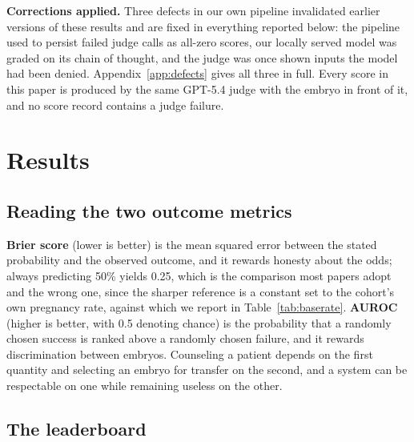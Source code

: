 \documentclass[11pt]{article}
\begin{document}
\textbf{Corrections applied.} Three defects in our own pipeline invalidated
earlier versions of these results and are fixed in everything reported below: the
pipeline used to persist failed judge calls as all-zero scores, our locally
served model was graded on its chain of thought, and the judge was once shown
inputs the model had been denied. Appendix~\ref{app:defects} gives all three in
full. Every score in this paper is produced by the same GPT-5.4 judge with the
embryo in front of it, and no score record contains a judge failure.


\section{Results}
\label{sec:results}


\subsection{Reading the two outcome metrics}

\textbf{Brier score} (lower is better) is the mean squared error between the
stated probability and the observed outcome, and it rewards honesty about the
odds; always predicting 50\% yields 0.25, which is the comparison most papers
adopt and the wrong one, since the sharper reference is a constant set to the
cohort's own pregnancy rate, against which we report in
Table~\ref{tab:baserate}. \textbf{AUROC} (higher is better, with 0.5 denoting
chance) is the probability that a randomly chosen success is ranked above a
randomly chosen failure, and it rewards discrimination between embryos.
Counseling a patient depends on the first quantity and selecting an embryo for
transfer on the second, and a system can be respectable on one while remaining
useless on the other.

\subsection{The leaderboard}
\end{document}
